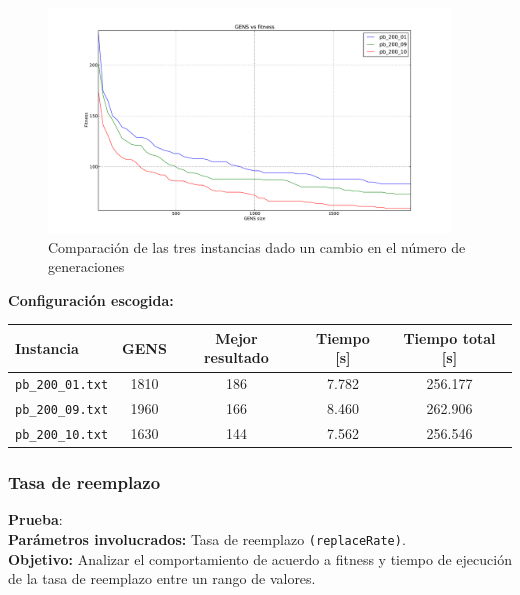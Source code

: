 \begin{figure}[h!]
\begin{center}
	\includegraphics[width=0.95\textwidth]{img/2.pdf}
	\caption{Comparaci\'on de las tres instancias dado un cambio en el n\'umero de generaciones}
	\label{fig:2}
\end{center}
\end{figure}

\textbf{Configuración escogida:}\\

\begin{center}
\begin{tabular}{|l|c|c|c|c|}
	\hline
	\textbf{Instancia} & \textbf{GENS} &\textbf{Mejor resultado} & \textbf{Tiempo [s] } & \textbf{Tiempo total [s]}\\\hline
	\texttt{pb\_200\_01.txt} & 1810 & 186 & 7.782 & 256.177 \\\hline
	\texttt{pb\_200\_09.txt} & 1960 & 166 & 8.460 & 262.906 \\\hline
	\texttt{pb\_200\_10.txt} & 1630 & 144 & 7.562 & 256.546 \\\hline
\end{tabular}
\end{center}

\newpage
\subsubsection{Tasa de reemplazo}

\textbf{Prueba}: \\

\textbf{Parámetros involucrados:} Tasa de reemplazo \texttt{(replaceRate)}.\\

\textbf{Objetivo:} Analizar el comportamiento de acuerdo a fitness y tiempo de ejecución de la tasa de reemplazo entre un rango de valores.\\


